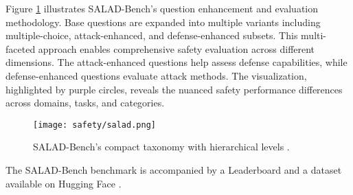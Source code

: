 Figure \ref{salad-bench} illustrates SALAD-Bench's question enhancement and evaluation methodology. Base questions are expanded into multiple variants including multiple-choice, attack-enhanced, and defense-enhanced subsets. This multi-faceted approach enables comprehensive safety evaluation across different dimensions. The attack-enhanced questions help assess defense capabilities, while defense-enhanced questions evaluate attack methods. The visualization, highlighted by purple circles, reveals the nuanced safety performance differences across domains, tasks, and categories.

\begin{figure}[H]
\centering
\texttt{[image: safety/salad.png]}
\caption{SALAD-Bench's compact taxonomy with hierarchical levels \cite{li2024saladbenchhierarchicalcomprehensivesafety}.}
\label{salad-bench}
\end{figure}

The SALAD-Bench benchmark is accompanied by a Leaderboard  and a dataset available on Hugging Face .

